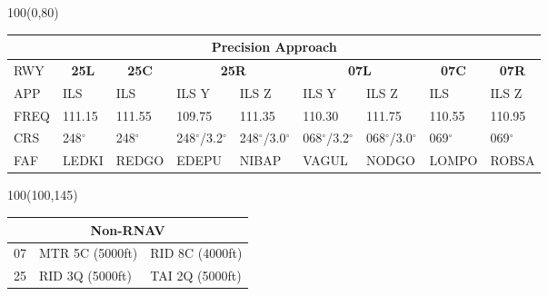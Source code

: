 \documentclass[10pt,landscape,a4paper]{article}
\begin{document}
\begin{textblock}{100}(0,80)
\begin{table}[]
\begin{tabular}{|l|l|l|l|l|l|l|l|l|}
\multicolumn{9}{c}{\textbf{Precision Approach}}                                                                                                                                                                            \\ \hline
RWY  & \multicolumn{1}{c|}{\textbf{25L}} & \multicolumn{1}{c|}{\textbf{25C}} & \multicolumn{2}{c|}{\textbf{25R}} & \multicolumn{2}{c|}{\textbf{07L}} & \multicolumn{1}{c|}{\textbf{07C}} & \multicolumn{1}{c|}{\textbf{07R}} \\ \hline
APP  & ILS                               & ILS                               & ILS Y           & ILS Z           & ILS Y           & ILS Z           & ILS                               & ILS Z                             \\
FREQ & 111.15                            & 111.55                            & 109.75          & 111.35          & 110.30          & 111.75          & 110.55                            & 110.95                            \\
CRS  & 248$^\circ$                              & 248$^\circ$                              & 248$^\circ$/3.2$^\circ$       & 248$^\circ$/3.0$^\circ$       & 068$^\circ$/3.2$^\circ$       & 068$^\circ$/3.0$^\circ$       & 069$^\circ$                              & 069$^\circ$                              \\
FAF  & LEDKI                             & REDGO                             & EDEPU           & NIBAP           & VAGUL           & NODGO           & LOMPO                             & ROBSA                             \\ \hline
\end{tabular}
\end{table}
\end{textblock}



\begin{textblock}{100}(100,145)
\begin{table}[]
\begin{tabular}{|l|l|l|}
\multicolumn{3}{c}{\textbf{Non-RNAV}} \\ \hline
07  & MTR 5C (5000ft)    & RID 8C (4000ft)   \\ \hline
25  & RID 3Q (5000ft)    & TAI 2Q (5000ft)   \\ \hline
\end{tabular}
\end{table}
\end{textblock}
\end{document}
